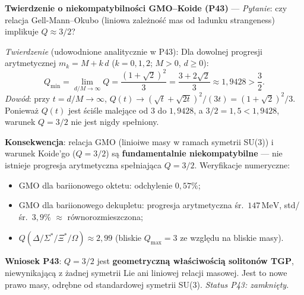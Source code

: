 \begin{problem}
\begin{description}[leftmargin=2em, labelindent=0pt]
  \textbf{Twierdzenie o niekompatybilno\'sci GMO--Koide (P43)} ---
  \emph{Pytanie}: czy relacja Gell-Mann--Okubo (liniowa zale\.zno\'s\'c
  mas od \l{}adunku strangeness) implikuje $Q \approx 3/2$?
  \par
  \emph{Twierdzenie} (udowodnione analitycznie w P43):
  Dla dowolnej progresji arytmetycznej $m_k = M + k\,d$
  ($k = 0, 1, 2$; $M > 0$, $d \geq 0$):
  \begin{equation}
    Q_\mathrm{min}
    = \lim_{d/M \to \infty} Q
    = \frac{(1+\sqrt{2})^2}{3}
    = \frac{3 + 2\sqrt{2}}{3}
    \approx 1{,}9428 > \frac{3}{2}.
  \end{equation}
  \emph{Dow\'od}: przy $t = d/M \to \infty$,
  $Q(t) \to (\sqrt{t} + \sqrt{2t})^2/(3t) = (1+\sqrt{2})^2/3$.
  Poniewa\.z $Q(t)$ jest \'sci\'sle malej\k{a}ce od 3 do $1{,}9428$,
  a $3/2 = 1{,}5 < 1{,}9428$, warunek $Q = 3/2$ nie jest nigdy spe\l{}niony.
  \par
  \textbf{Konsekwencja}: relacja GMO (linioiwe masy w ramach symetrii SU(3))
  i warunek Koide'go ($Q = 3/2$) s\k{a}
  \textbf{fundamentalnie niekompatybilne} --- nie istnieje progresja
  arytmetyczna spe\l{}niaj\k{a}ca $Q = 3/2$.
  Weryfikacje numeryczne:
  \begin{itemize}[nosep]
    \item GMO dla bariionowego oktetu: odchylenie $0{,}57\%$;
    \item GMO dla bariionowego dekupletu: progresja arytmetyczna
          \'sr.~$147\,\text{MeV}$, std/\'sr.~$3{,}9\%$ $\approx$ r\'ownorozmieszczona;
    \item $Q(\Delta/\Sigma^*/\Xi^*/\Omega) \approx 2{,}99$ (bliskie
          $Q_\mathrm{max} = 3$ ze wzgl\k{e}du na bliskie masy).
  \end{itemize}
  \textbf{Wniosek P43}: $Q = 3/2$ jest \textbf{geometryczn\k{a} w\l{}a\'sciwo\'sci\k{a}
  soliton\'ow TGP}, niewynikaj\k{a}c\k{a} z \.zadnej symetrii Lie ani
  liniowej relacji masowej.
  Jest to nowe prawo masy, odr\k{e}bne od standardowej symetrii SU(3).
  \textit{Status P43: zamkni\k{e}ty.}


\end{description}
\end{problem}
